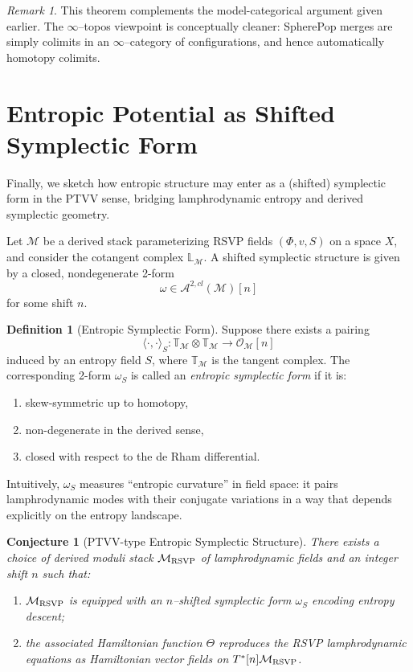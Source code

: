 \documentclass[12pt]{article}
\theoremstyle{plain}
\newtheorem{conjecture_env}[theorem]{Conjecture}
\theoremstyle{definition}
\newtheorem{definition}[theorem]{Definition}
\theoremstyle{remark}
\newtheorem{remark}[theorem]{Remark}
\begin{document}
\begin{remark}
This theorem complements the model-categorical argument given earlier. The
$\infty$--topos viewpoint is conceptually cleaner: SpherePop merges are simply
colimits in an $\infty$--category of configurations, and hence automatically
homotopy colimits.
\end{remark}


\section{Entropic Potential as Shifted Symplectic Form}

Finally, we sketch how entropic structure may enter as a (shifted) symplectic
form in the PTVV sense, bridging lamphrodynamic entropy and derived symplectic
geometry.

Let $\mathcal{M}$ be a derived stack parameterizing RSVP fields
$(\Phi,v,S)$ on a space $X$, and consider the cotangent complex
$\mathbb{L}_{\mathcal{M}}$. A shifted symplectic structure is given by a
closed, nondegenerate 2-form
\[
    \omega \in \mathcal{A}^{2,cl}(\mathcal{M})[n]
\]
for some shift $n$.

\begin{definition}[Entropic Symplectic Form]
Suppose there exists a pairing
\[
    \langle \cdot,\cdot \rangle_S :
    \mathbb{T}_{\mathcal{M}} \otimes \mathbb{T}_{\mathcal{M}}
    \to \mathcal{O}_{\mathcal{M}}[n]
\]
induced by an entropy field $S$, where $\mathbb{T}_{\mathcal{M}}$ is the
tangent complex. The corresponding 2-form $\omega_S$ is called an
\emph{entropic symplectic form} if it is:
\begin{enumerate}
    \item skew-symmetric up to homotopy,
    \item non-degenerate in the derived sense,
    \item closed with respect to the de Rham differential.
\end{enumerate}
\end{definition}

Intuitively, $\omega_S$ measures ``entropic curvature'' in field space: it
pairs lamphrodynamic modes with their conjugate variations in a way that
depends explicitly on the entropy landscape.

\begin{conjecture_env}[PTVV-type Entropic Symplectic Structure]
There exists a choice of derived moduli stack $\mathcal{M}_{\rm RSVP}$ of
lamphrodynamic fields and an integer shift $n$ such that:
\begin{enumerate}
    \item $\mathcal{M}_{\rm RSVP}$ is equipped with an $n$--shifted symplectic
          form $\omega_S$ encoding entropy descent;
    \item the associated Hamiltonian function $\Theta$ reproduces the RSVP
          lamphrodynamic equations as Hamiltonian vector fields on
          $T^\ast[n]\mathcal{M}_{\rm RSVP}$.
\end{enumerate}
\end{conjecture_env}
\end{document}
